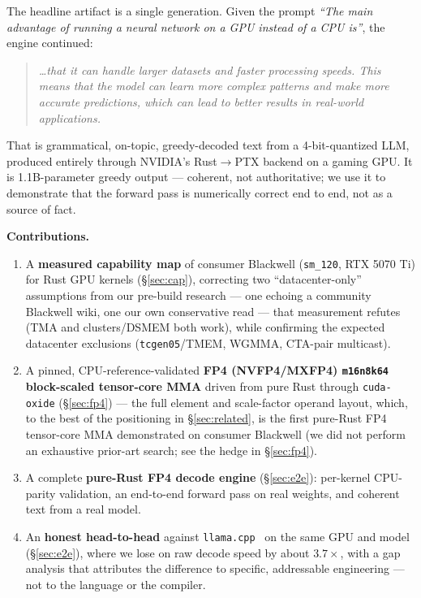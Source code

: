 \documentclass[11pt]{article}
\begin{document}
The headline artifact is a single generation. Given the prompt \emph{``The main advantage of running a neural network on a GPU instead of a CPU is''}, the engine continued:

\begin{quote}\itshape
\ldots that it can handle larger datasets and faster processing speeds. This means that the model can learn more complex patterns and make more accurate predictions, which can lead to better results in real-world applications.
\end{quote}

That is grammatical, on-topic, greedy-decoded text from a 4-bit-quantized LLM, produced entirely through NVIDIA's Rust$\rightarrow$PTX backend on a gaming GPU. It is 1.1B-parameter greedy output --- coherent, not authoritative; we use it to demonstrate that the forward pass is numerically correct end to end, not as a source of fact.

\textbf{Contributions.}
\begin{enumerate}
\item A \textbf{measured capability map} of consumer Blackwell (\texttt{sm\_120}, RTX 5070 Ti) for Rust GPU kernels (\S\ref{sec:cap}), correcting two ``datacenter-only'' assumptions from our pre-build research --- one echoing a community Blackwell wiki, one our own conservative read --- that measurement refutes (TMA and clusters/DSMEM both work), while confirming the expected datacenter exclusions (\texttt{tcgen05}/TMEM, WGMMA, CTA-pair multicast).
\item A pinned, CPU-reference-validated \textbf{FP4 (NVFP4/MXFP4) \texttt{m16n8k64} block-scaled tensor-core MMA} driven from pure Rust through \texttt{cuda-oxide} (\S\ref{sec:fp4}) --- the full element and scale-factor operand layout, which, to the best of the positioning in \S\ref{sec:related}, is the first pure-Rust FP4 tensor-core MMA demonstrated on consumer Blackwell (we did not perform an exhaustive prior-art search; see the hedge in \S\ref{sec:fp4}).
\item A complete \textbf{pure-Rust FP4 decode engine} (\S\ref{sec:e2e}): per-kernel CPU-parity validation, an end-to-end forward pass on real weights, and coherent text from a real model.
\item An \textbf{honest head-to-head} against \texttt{llama.cpp}~\citep{llamacpp} on the same GPU and model (\S\ref{sec:e2e}), where we lose on raw decode speed by about $3.7\times$, with a gap analysis that attributes the difference to specific, addressable engineering --- not to the language or the compiler.
\end{enumerate}
\end{document}
